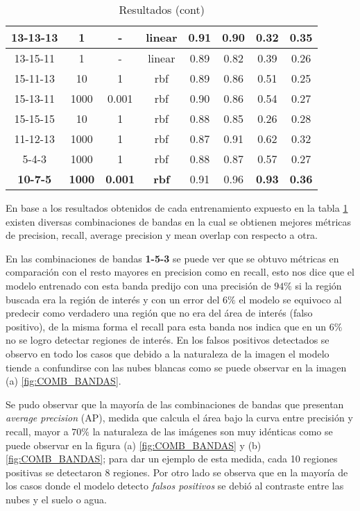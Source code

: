 \begin{table}[H]
\begin{center}
\begin{tabular}{|c|c|c|c|c|c|c|c|}
\multicolumn{1}{|c|}{13-13-13} & 1 & - & linear & 0.91 & 0.90 & 0.32 & 0.35 \\ \hline
\multicolumn{1}{|c|}{13-15-11} & 1 & - & linear & 0.89 & 0.82 & 0.39 & 0.26 \\ \hline
\multicolumn{1}{|c|}{15-11-13} & 10 & 1 & rbf & 0.89 & 0.86 & 0.51 & 0.25 \\ \hline
\multicolumn{1}{|c|}{15-13-11} & 1000 & 0.001 & rbf & 0.90 & 0.86 & 0.54 & 0.27 \\ \hline
\multicolumn{1}{|c|}{15-15-15} & 10 & 1 & rbf & 0.88 & 0.85 & 0.26 & 0.28 \\ \hline
\multicolumn{1}{|c|}{11-12-13} & 1000 & 1 & rbf & 0.87 & 0.91 & 0.62 & 0.32 \\ \hline
\multicolumn{1}{|c|}{5-4-3} & 1000 & 1 & rbf & 0.88 & 0.87 & 0.57 & 0.27 \\ \hline
\multicolumn{1}{|c|}{\textbf{10-7-5}} & \textbf{1000} &\textbf{ 0.001} & \textbf{rbf} & 0.91 & 0.96 &\cellcolor{blue!25}\textbf{0.93} & \cellcolor{blue!25}\textbf{0.36}\\ \hline
\end{tabular}
\end{center}\caption{Resultados (cont)}\label{tab:entrenam-result}
\end{table}

En base a los resultados obtenidos de cada entrenamiento expuesto en la tabla \ref{tab:entrenam-result} existen diversas combinaciones de bandas en la cual se obtienen mejores métricas de precision, recall, average precision y mean overlap con respecto a otra.  

En las combinaciones de bandas \textbf{1-5-3} se puede ver que se obtuvo métricas en comparación con el resto mayores en precision como en recall, esto nos dice que el modelo entrenado con esta banda predijo con una precisión de  $94\%$  si la región buscada era la región de interés y con un error del $6\%$ el modelo se equivoco al predecir como verdadero una región que no era del área de interés (falso positivo), de la misma forma el recall para esta banda nos indica que en un $6\%$ no se logro detectar regiones de interés. En los falsos positivos detectados se observo en todo los casos que debido a la naturaleza de la imagen el modelo tiende a confundirse con las nubes blancas como se puede observar en la imagen (a) \ref{fig:COMB_BANDAS}.

Se pudo observar que la mayoría de las combinaciones de bandas que presentan \textit{average precision} (AP), medida que calcula  el área bajo la curva entre precisión y recall, mayor a $70\%$ la naturaleza de las imágenes son muy idénticas como se puede observar en la figura (a) \ref{fig:COMB_BANDAS} y (b) \ref{fig:COMB_BANDAS}; para dar un ejemplo de esta medida, cada 10 regiones positivas se detectaron $8$ regiones. Por otro lado se observa que en la mayoría de los casos donde el modelo detecto \textit{falsos positivos} se debió al contraste entre las nubes y el suelo o agua.



